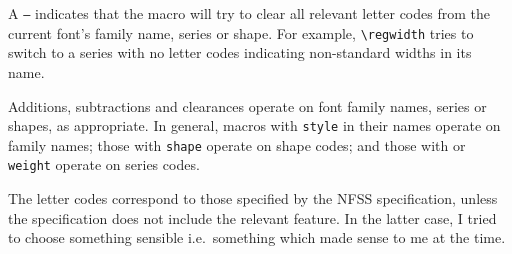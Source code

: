\documentclass[pagesize=auto, fontsize=10pt, DIV=11]{scrartcl}
\newcommand*{\cs}[1]{\texttt{\textbackslash #1}}
\begin{document}
A \texttt{--} indicates that the macro will try to clear all relevant letter codes from the current font's family name, series or shape.
For example, \cs{regwidth} tries to switch to a series with no letter codes indicating non-standard widths in its name.

Additions, subtractions and clearances operate on font family names, series or shapes, as appropriate.
In general, macros with \texttt{style} in their names operate on family names; those with \texttt{shape} operate on shape codes; and those with  or \texttt{weight} operate on series codes.

The letter codes correspond to those specified by the NFSS specification, unless the specification does not include the relevant feature.
In the latter case, I tried to choose something sensible i.e.~something which made sense to me at the time.
\end{document}
